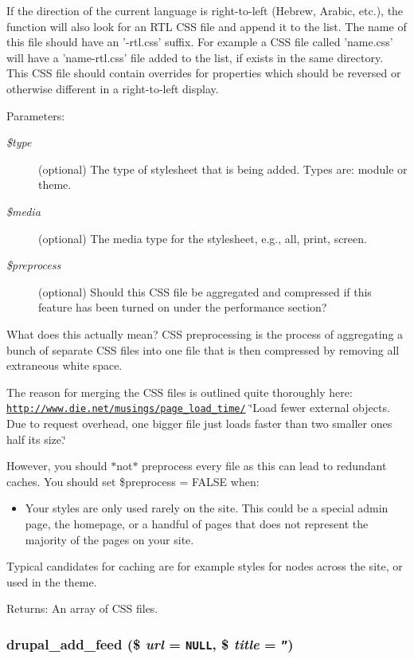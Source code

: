 If the direction of the current language is right-to-left (Hebrew, Arabic, etc.), the function will also look for an RTL CSS file and append it to the list. The name of this file should have an '-rtl.css' suffix. For example a CSS file called 'name.css' will have a 'name-rtl.css' file added to the list, if exists in the same directory. This CSS file should contain overrides for properties which should be reversed or otherwise different in a right-to-left display. \begin{Desc}
\item[Parameters:]
\begin{description}
\item[{\em \$type}](optional) The type of stylesheet that is being added. Types are: module or theme. \item[{\em \$media}](optional) The media type for the stylesheet, e.g., all, print, screen. \item[{\em \$preprocess}](optional) Should this CSS file be aggregated and compressed if this feature has been turned on under the performance section?\end{description}
\end{Desc}
What does this actually mean? CSS preprocessing is the process of aggregating a bunch of separate CSS files into one file that is then compressed by removing all extraneous white space.

The reason for merging the CSS files is outlined quite thoroughly here: \href{http://www.die.net/musings/page_load_time/}{\tt http://www.die.net/musings/page\_\-load\_\-time/} \char`\"{}Load fewer external objects. Due to request overhead, one bigger file just loads faster than two smaller ones half its size.\char`\"{}

However, you should $\ast$not$\ast$ preprocess every file as this can lead to redundant caches. You should set \$preprocess = FALSE when:

\begin{itemize}
\item Your styles are only used rarely on the site. This could be a special admin page, the homepage, or a handful of pages that does not represent the majority of the pages on your site.\end{itemize}


Typical candidates for caching are for example styles for nodes across the site, or used in the theme. \begin{Desc}
\item[Returns:]An array of CSS files. \end{Desc}
\hypertarget{common_8inc_42e1c8001e2609cb73a2f54f59e1020c}{
\subsubsection[{drupal\_\-add\_\-feed}]{\setlength{\rightskip}{0pt plus 5cm}drupal\_\-add\_\-feed (\$ {\em url} = {\tt NULL}, \/  \$ {\em title} = {\tt ''})}}
\label{common_8inc_42e1c8001e2609cb73a2f54f59e1020c}


